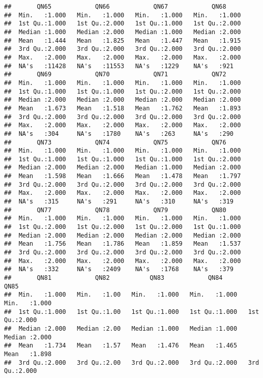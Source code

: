 \documentclass[
]{article}
\begin{document}
\begin{verbatim}
##       QN65            QN66            QN67            QN68      
##  Min.   :1.000   Min.   :1.000   Min.   :1.000   Min.   :1.000  
##  1st Qu.:1.000   1st Qu.:2.000   1st Qu.:1.000   1st Qu.:2.000  
##  Median :1.000   Median :2.000   Median :1.000   Median :2.000  
##  Mean   :1.444   Mean   :1.825   Mean   :1.447   Mean   :1.915  
##  3rd Qu.:2.000   3rd Qu.:2.000   3rd Qu.:2.000   3rd Qu.:2.000  
##  Max.   :2.000   Max.   :2.000   Max.   :2.000   Max.   :2.000  
##  NA's   :11428   NA's   :11553   NA's   :1229    NA's   :921    
##       QN69            QN70            QN71            QN72      
##  Min.   :1.000   Min.   :1.000   Min.   :1.000   Min.   :1.000  
##  1st Qu.:1.000   1st Qu.:1.000   1st Qu.:2.000   1st Qu.:2.000  
##  Median :2.000   Median :2.000   Median :2.000   Median :2.000  
##  Mean   :1.673   Mean   :1.518   Mean   :1.762   Mean   :1.893  
##  3rd Qu.:2.000   3rd Qu.:2.000   3rd Qu.:2.000   3rd Qu.:2.000  
##  Max.   :2.000   Max.   :2.000   Max.   :2.000   Max.   :2.000  
##  NA's   :304     NA's   :1780    NA's   :263     NA's   :290    
##       QN73            QN74            QN75            QN76      
##  Min.   :1.000   Min.   :1.000   Min.   :1.000   Min.   :1.000  
##  1st Qu.:1.000   1st Qu.:1.000   1st Qu.:1.000   1st Qu.:2.000  
##  Median :2.000   Median :2.000   Median :1.000   Median :2.000  
##  Mean   :1.598   Mean   :1.666   Mean   :1.478   Mean   :1.797  
##  3rd Qu.:2.000   3rd Qu.:2.000   3rd Qu.:2.000   3rd Qu.:2.000  
##  Max.   :2.000   Max.   :2.000   Max.   :2.000   Max.   :2.000  
##  NA's   :315     NA's   :291     NA's   :310     NA's   :319    
##       QN77            QN78            QN79            QN80      
##  Min.   :1.000   Min.   :1.000   Min.   :1.000   Min.   :1.000  
##  1st Qu.:2.000   1st Qu.:2.000   1st Qu.:2.000   1st Qu.:1.000  
##  Median :2.000   Median :2.000   Median :2.000   Median :2.000  
##  Mean   :1.756   Mean   :1.786   Mean   :1.859   Mean   :1.537  
##  3rd Qu.:2.000   3rd Qu.:2.000   3rd Qu.:2.000   3rd Qu.:2.000  
##  Max.   :2.000   Max.   :2.000   Max.   :2.000   Max.   :2.000  
##  NA's   :332     NA's   :2409    NA's   :1768    NA's   :379    
##       QN81            QN82           QN83            QN84            QN85      
##  Min.   :1.000   Min.   :1.00   Min.   :1.000   Min.   :1.000   Min.   :1.000  
##  1st Qu.:1.000   1st Qu.:1.00   1st Qu.:1.000   1st Qu.:1.000   1st Qu.:2.000  
##  Median :2.000   Median :2.00   Median :1.000   Median :1.000   Median :2.000  
##  Mean   :1.734   Mean   :1.57   Mean   :1.476   Mean   :1.465   Mean   :1.898  
##  3rd Qu.:2.000   3rd Qu.:2.00   3rd Qu.:2.000   3rd Qu.:2.000   3rd Qu.:2.000  

\end{verbatim}
\end{document}
